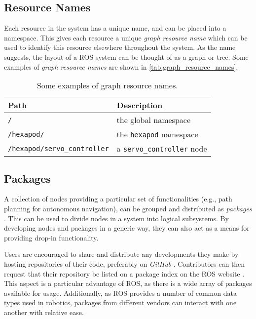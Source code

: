 \subsection{Resource Names}

Each resource in the system has a unique name, and can be placed into a namespace. This gives each resource a unique \emph{graph resource name} which can be used to identify this resource elsewhere throughout the system. As the name suggests, the layout of a ROS system can be thought of as a graph or tree. Some examples of \emph{graph resource names} are shown in \autoref{tab:graph_resource_names}.

\begin{table}[!h]
    \centering
    \begin{tabular}{  l l  }
        \toprule
        \textbf{Path} & \textbf{Description} \\
        \midrule
        \texttt{/} & the global namespace \\
        \texttt{/hexapod/} & the \texttt{hexapod} namespace \\
        \texttt{/hexapod/servo\_controller} & a \texttt{servo\_controller} node \\
        \bottomrule
    \end{tabular}
    \caption{Some examples of graph resource names.}
    \label{tab:graph_resource_names}
\end{table}

\subsection{Packages}
A collection of nodes providing a particular set of functionalities (e.g., path planning for autonomous navigation), can be grouped and distributed as \emph{packages} \cite{ros_paper}. This can be used to divide nodes in a system into logical subsystems. By developing nodes and packages in a generic way, they can also act as a means for providing drop-in functionality.

Users are encouraged to share and distribute any developments they make by hosting repositories of their code, preferably on \emph{GitHub} \cite{ros_wiki_getinvolved}. Contributors can then request that their repository be listed on a package index on the ROS website \cite{ros_wiki_getinvolved}. This aspect is a particular advantage of ROS, as there is a wide array of packages available for usage. Additionally, as ROS provides a number of common data types used in robotics, packages from different vendors can interact with one another with relative ease.

